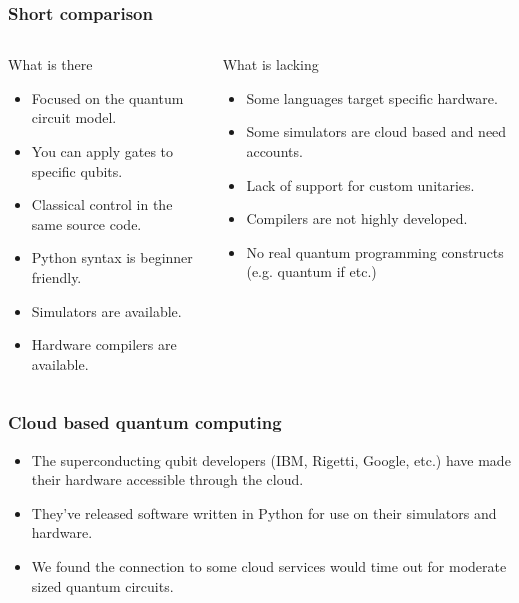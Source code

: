 \documentclass{beamer}
\begin{document}
\begin{frame}
\frametitle{Short comparison}
\begin{columns}
    \begin{block}{What is there}
    \begin{itemize}
        \item Focused on the quantum circuit model.
        \item You can apply gates to specific qubits.
        \item Classical control in the same source code.
        \item Python syntax is beginner friendly.
        \item Simulators are available.
        \item Hardware compilers are available.
    \end{itemize}
    \end{block}
    \begin{block}{What is lacking}
        \begin{itemize}
            \item Some languages target specific hardware.
            \item Some simulators are cloud based and need accounts.
            \item Lack of support for custom unitaries.
            \item Compilers are not highly developed.
            \item No real quantum programming constructs (e.g. quantum if etc.)
        \end{itemize}
        \end{block}
\end{columns}
\end{frame}

\begin{frame}
  \frametitle{Cloud based quantum computing}
  \begin{itemize}
  \item The superconducting qubit developers (IBM, Rigetti, Google, etc.) have made their hardware accessible through the cloud. 
  \item They've released software written in Python for use on their simulators and hardware.
    \item We found the connection to some cloud services would time out for moderate sized quantum circuits.
  \end{itemize}
\end{frame}
\end{document}
